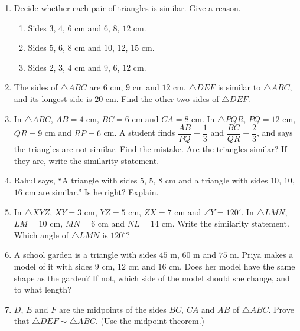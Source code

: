 \documentclass[11pt,a4paper]{article}
\theoremstyle{brand}
\theoremstyle{branddef}
\newcommand{\tr}{\triangle}
\newenvironment{exercise}[1]
  {\par\medskip\Needspace{7\baselineskip}\noindent{\large\bfseries\color{accent}Exercise #1}
   \par\smallskip
   \begin{enumerate}[leftmargin=*,itemsep=4pt]}
  {\end{enumerate}}
\begin{document}
\begin{exercise}{2E}
  \item Decide whether each pair of triangles is similar. Give a reason.
  \begin{enumerate}[label=(\alph*),itemsep=1pt]
    \item Sides $3$, $4$, $6$ cm and $6$, $8$, $12$ cm.
    \item Sides $5$, $6$, $8$ cm and $10$, $12$, $15$ cm.
    \item Sides $2$, $3$, $4$ cm and $9$, $6$, $12$ cm.
  \end{enumerate}
  \item The sides of $\tr ABC$ are $6$ cm, $9$ cm and $12$ cm. $\tr DEF$ is similar to $\tr ABC$, and its longest side is $20$ cm. Find the other two sides of $\tr DEF$.
  \item In $\tr ABC$, $AB=4$ cm, $BC=6$ cm and $CA=8$ cm. In $\tr PQR$, $PQ=12$ cm, $QR=9$ cm and $RP=6$ cm. A student finds $\dfrac{AB}{PQ}=\dfrac13$ and $\dfrac{BC}{QR}=\dfrac23$, and says the triangles are not similar. Find the mistake. Are the triangles similar? If they are, write the similarity statement.
  \item Rahul says, ``A triangle with sides $5$, $5$, $8$ cm and a triangle with sides $10$, $10$, $16$ cm are similar.'' Is he right? Explain.
  \item In $\tr XYZ$, $XY=3$ cm, $YZ=5$ cm, $ZX=7$ cm and $\angle Y=120^\circ$. In $\tr LMN$, $LM=10$ cm, $MN=6$ cm and $NL=14$ cm. Write the similarity statement. Which angle of $\tr LMN$ is $120^\circ$?
  \item A school garden is a triangle with sides $45$ m, $60$ m and $75$ m. Priya makes a model of it with sides $9$ cm, $12$ cm and $16$ cm. Does her model have the same shape as the garden? If not, which side of the model should she change, and to what length?
  \item $D$, $E$ and $F$ are the midpoints of the sides $BC$, $CA$ and $AB$ of $\tr ABC$. Prove that $\tr DEF\sim\tr ABC$. (Use the midpoint theorem.)
\end{exercise}
\end{document}
